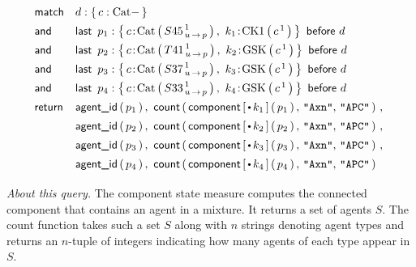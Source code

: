 \begin{small}
\begin{equation}
  \Query{
    \m{match} & d:\Set{ c:\BetaCat - } \\
    \m{and} & \BigHectorStoryLine{p_1}{S45}{k_1}{\CKOne} \\
    \m{and} & \BigHectorStoryLine{p_2}{T41}{k_2}{\GSK}   \\
    \m{and} & \BigHectorStoryLine{p_3}{S37}{k_3}{\GSK}   \\
    \m{and} & \BigHectorStoryLine{p_4}{S33}{k_4}{\GSK}   \\
    \m{return} 
    & \BigHectorStoryRet{p_1}{k_1} \,,\  \\
    & \BigHectorStoryRet{p_2}{k_2} \,,\ \\
    & \BigHectorStoryRet{p_3}{k_3} \,,\  \\
    & \BigHectorStoryRet{p_4}{k_4} \\
  }
\end{equation}
\end{small}

\noindent \textit{About this query.} The \textsf{component} state
measure computes the connected component that contains an agent in a
mixture. It returns a set of agents $S$. The \textsf{count} function
takes such a set $S$ along with $n$ strings denoting agent types and
returns an $n$-tuple of integers indicating how many agents of each
type appear in $S$.
